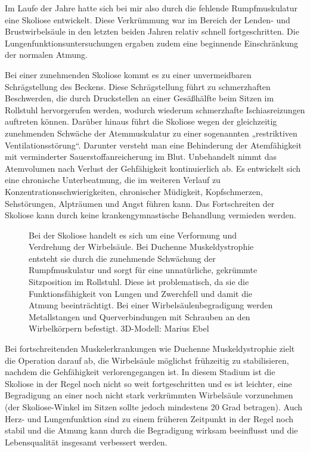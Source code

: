 \documentclass[fontsize=14pt,a4paper,headinclude,DIV=calc,automark]{scrbook}
\begin{document}
Im Laufe der Jahre hatte sich bei mir also durch die fehlende Rumpfmuskulatur eine Skoliose entwickelt. Diese Verkrümmung war im Bereich der Lenden- und Brustwirbelsäule in den letzten beiden Jahren relativ schnell fortgeschritten. Die Lungenfunktionsuntersuchungen ergaben zudem eine beginnende Einschränkung der normalen Atmung.

Bei einer zunehmenden Skoliose kommt es zu einer unvermeidbaren Schrägstellung des Beckens. Diese Schrägstellung führt zu schmerzhaften Beschwerden, die durch Druckstellen an einer Gesäßhälfte beim Sitzen im Rollstuhl hervorgerufen werden, wodurch wiederum schmerzhafte Ischiasreizungen auftreten können. Darüber hinaus führt die Skoliose wegen der gleichzeitig zunehmenden Schwäche der Atemmuskulatur zu einer sogenannten „restriktiven Ventilationsstörung“. Darunter versteht man eine Behinderung der Atemfähigkeit mit verminderter Sauerstoffanreicherung im Blut. Unbehandelt nimmt das Atemvolumen nach Verlust der Gehfähigkeit kontinuierlich ab. Es entwickelt sich eine chronische Unterbeatmung, die im weiteren Verlauf zu Konzentrationsschwierigkeiten, chronischer Müdigkeit, Kopfschmerzen, Sehstörungen, Alpträumen und Angst führen kann. Das Fortschreiten der Skoliose kann durch keine krankengymnastische Behandlung vermieden werden.

\setlength{\fboxsep}{0pt}    %
\setlength{\fboxrule}{0.2pt} %
\begin{figure}[H]
    \centering
    \caption{Bei der Skoliose handelt es sich um eine Verformung und Verdrehung der Wirbelsäule. Bei Duchenne Muskeldystrophie entsteht sie durch die zunehmende Schwächung der Rumpfmuskulatur und sorgt für eine unnatürliche, gekrümmte Sitzposition im Rollstuhl. Diese ist problematisch, da sie die Funktionsfähigkeit von Lungen und Zwerchfell und damit die Atmung beeinträchtigt. Bei einer Wirbelsäulenbegradigung werden Metallstangen und Querverbindungen mit Schrauben an den Wirbelkörpern befestigt. 3D-Modell: Marius Ebel}
    \label{fig:wirbelsäulenbegradigung}
\end{figure}

Bei fortschreitenden Muskelerkrankungen wie Duchenne Muskeldystrophie zielt die Operation darauf ab, die Wirbelsäule möglichst frühzeitig zu stabilisieren, nachdem die Gehfähigkeit verlorengegangen ist. In diesem Stadium ist die Skoliose in der Regel noch nicht so weit fortgeschritten und es ist leichter, eine Begradigung an einer noch nicht stark verkrümmten Wirbelsäule vorzunehmen (der Skoliose-Winkel im Sitzen sollte jedoch mindestens 20 Grad betragen). Auch Herz- und Lungenfunktion sind zu einem früheren Zeitpunkt in der Regel noch stabil und die Atmung kann durch die Begradigung wirksam beeinflusst und die Lebensqualität insgesamt verbessert werden.
\end{document}

